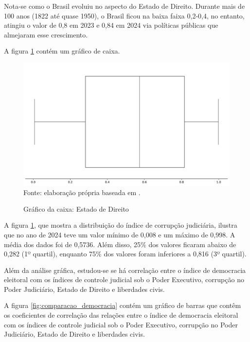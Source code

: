 Nota-se como o Brasil evoluiu no aspecto do Estado de Direito. Durante mais de 100 anos (1822 até quase 1950), o Brasil ficou na baixa faixa 0,2-0,4, no entanto, atingiu o valor de 0,8 em 2023 e 0,84 em 2024 via políticas públicas que almejaram esse crescimento.

A figura \ref{fig:quartis_estado_direito} contém um gráfico de caixa.

\begin{figure}[H]
	\centering
	\caption{Gráfico da caixa: Estado de Direito}
	\includegraphics[width=1\linewidth]{figuras/quartis_estado_direito.png}
	\label{fig:quartis_estado_direito}
	\footnotesize{Fonte: elaboração própria baseada em \cite{rule-of-law-index}.}
\end{figure}

A figura \ref{fig:quartis_estado_direito}, que mostra a distribuição do índice de corrupção judiciária, ilustra que no ano de 2024 teve um valor mínimo de 0,008 e um máximo de 0,998. A média dos dados foi de 0,5736. Além disso, 25\% dos valores ficaram abaixo de 0,282 (1º quartil), enquanto 75\% dos valores foram inferiores a 0,816 (3º quartil).

Além da análise gráfica, estudou-se se há correlação entre o índice de democracia eleitoral com os índices de controle judicial sob o Poder Executivo, corrupção no Poder Judiciário, Estado de Direito e liberdades civis.

A figura \ref{fig:comparacao_democracia} contém um gráfico de barras que contêm os coeficientes de correlação das relações entre o índice de democracia eleitoral com os índices de controle judicial sob o Poder Executivo, corrupção no Poder Judiciário, Estado de Direito e liberdades civis.

